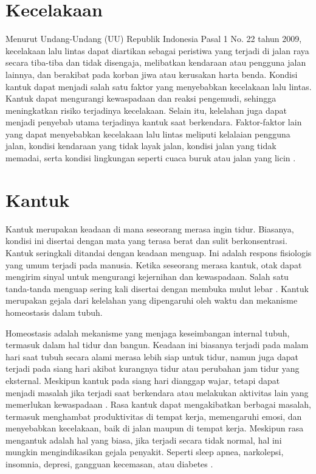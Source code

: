         


       
\section{Kecelakaan}

    Menurut Undang-Undang (UU) Republik Indonesia Pasal 1 No. 22 tahun 2009, kecelakaan lalu lintas dapat diartikan sebagai peristiwa yang terjadi di jalan raya secara tiba-tiba dan tidak disengaja, melibatkan kendaraan atau pengguna jalan lainnya, dan berakibat pada korban jiwa atau kerusakan harta benda. Kondisi kantuk dapat menjadi salah satu faktor yang menyebabkan kecelakaan lalu lintas. Kantuk dapat mengurangi kewaspadaan dan reaksi pengemudi, sehingga meningkatkan risiko terjadinya kecelakaan. Selain itu, kelelahan juga dapat menjadi penyebab utama terjadinya kantuk saat berkendara. Faktor-faktor lain yang dapat menyebabkan kecelakaan lalu lintas meliputi kelalaian pengguna jalan, kondisi kendaraan yang tidak layak jalan, kondisi jalan yang tidak memadai, serta kondisi lingkungan seperti cuaca buruk atau jalan yang licin \cite{Utomo2023}.
    

\section{Kantuk}
    Kantuk merupakan keadaan di mana seseorang merasa ingin tidur. Biasanya,
     kondisi ini disertai dengan mata yang terasa berat dan sulit 
     berkonsentrasi. Kantuk seringkali ditandai dengan keadaan menguap. 
     Ini adalah respons fisiologis yang umum terjadi pada manusia. 
     Ketika seseorang merasa kantuk, otak dapat mengirim sinyal 
     untuk mengurangi kejernihan dan kewaspadaan. Salah satu tanda-tanda 
     menguap sering kali disertai dengan membuka mulut lebar \cite{CALDWELL2019272}. Kantuk merupakan gejala dari kelelahan yang dipengaruhi oleh waktu dan mekanisme homeostasis dalam tubuh.
     
    Homeostasis adalah mekanisme yang menjaga keseimbangan internal tubuh, termasuk dalam hal tidur dan bangun. Keadaan ini biasanya terjadi pada malam hari saat tubuh secara alami merasa lebih siap untuk tidur, namun juga dapat terjadi pada siang hari akibat kurangnya tidur atau perubahan jam tidur yang eksternal. Meskipun kantuk pada siang hari dianggap wajar, tetapi dapat menjadi masalah jika terjadi saat berkendara atau melakukan aktivitas lain yang memerlukan kewaspadaan \cite{Puspasari2023}.
    Rasa kantuk dapat mengakibatkan berbagai masalah, termasuk menghambat 
    produktivitas di tempat kerja, memengaruhi emosi, dan menyebabkan 
    kecelakaan, baik di jalan maupun di tempat kerja. Meskipun rasa 
    mengantuk adalah hal yang biasa, jika terjadi secara tidak normal, 
    hal ini mungkin mengindikasikan gejala penyakit. Seperti sleep apnea, 
    narkolepsi, insomnia, depresi, gangguan kecemasan, atau 
    diabetes \cite{Susanto2020}.


